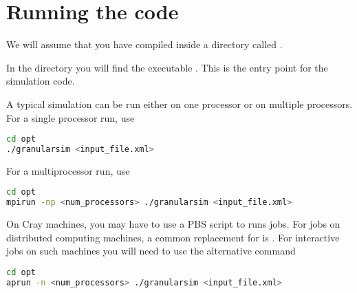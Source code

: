 \documentclass[11pt,fleqn]{book} %
\begin{document}
\section{Running the code}
\begin{WarningBox}
We will assume that you have compiled \GranularSim inside a directory called .
\end{WarningBox}

In the  directory you will find the executable .  This is the
entry point for the simulation code.

A typical simulation can be run either on one processor or on multiple processors.  For
a single processor run, use

\begin{lstlisting}[language=sh, backgroundcolor=\color{background}]
cd opt
./granularsim <input_file.xml>
\end{lstlisting}

For a multiprocessor run, use 
\begin{lstlisting}[language=sh, backgroundcolor=\color{background}]
cd opt
mpirun -np <num_processors> ./granularsim <input_file.xml>
\end{lstlisting}

On Cray machines, you may have to use a PBS script to runs jobs.  For jobs on
distributed computing machines, a common replacement for  is .
For interactive jobs on such machines you will need to use the alternative command
\begin{lstlisting}[language=sh, backgroundcolor=\color{background}]
cd opt
aprun -n <num_processors> ./granularsim <input_file.xml>
\end{lstlisting}
\end{document}
